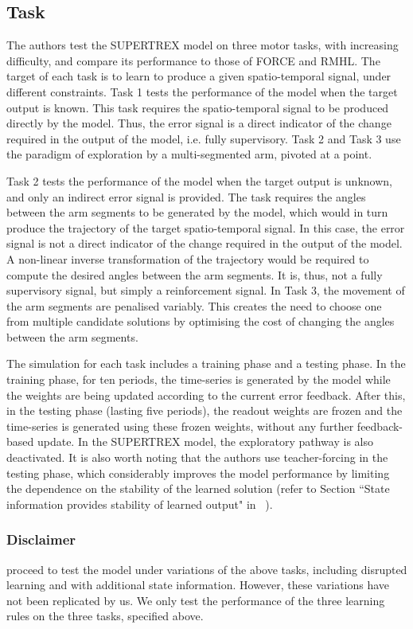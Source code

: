 \subsection{Task}

The authors test the SUPERTREX model on three motor tasks, with increasing difficulty, and compare its performance to those of FORCE and RMHL. The target of each task is to learn to produce a given spatio-temporal signal, under different constraints. Task 1 tests the performance of the model when the target output is known. This task requires the spatio-temporal signal to be produced directly by the model. Thus, the error signal is a direct indicator of the change required in the output of the model, i.e. fully supervisory. Task 2 and Task 3 use the paradigm of exploration by a multi-segmented arm, pivoted at a point. 

Task 2 tests the performance of the model when the target output is unknown, and only an indirect error signal is provided. The task requires the angles between the arm segments to be generated by the model, which would in turn produce the trajectory of the target spatio-temporal signal. In this case, the error signal is not a direct indicator of the change required in the output of the model. A non-linear inverse transformation of the trajectory would be required to compute the desired angles between the arm segments. It is, thus, not a fully supervisory signal, but simply a reinforcement signal. In Task 3, the movement of the arm segments are penalised variably. This creates the need to choose one from multiple candidate solutions by optimising the cost of changing the angles between the arm segments.

The simulation for each task includes a training phase and a testing phase. In the training phase, for ten periods, the time-series is generated by the model while the weights are being updated according to the current error feedback. After this, in the testing phase (lasting five periods), the readout weights are frozen and the time-series is generated using these frozen weights, without any further feedback-based update. In the SUPERTREX model, the exploratory pathway is also deactivated. It is also worth noting that the authors use teacher-forcing in the testing phase, which considerably improves the model performance by limiting the dependence on the stability of the learned solution (refer to Section ``State information provides stability of learned output" in ~\cite{pyle2019}).


\subsubsection{Disclaimer}
\textcite{pyle2019} proceed to test the model under variations of the above tasks, including disrupted learning and with additional state information. However, these variations have not been replicated by us. We only test the performance of the three learning rules on the three tasks, specified above.

